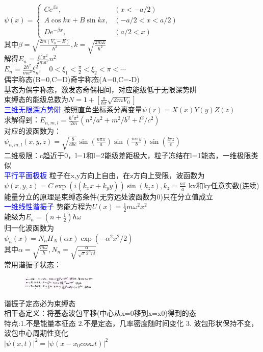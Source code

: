 \documentclass[a4paper,8pt]{extarticle} %
\newcommand{\bluetext}[1]{\textcolor{blue}{#1}}
\begin{document}
\begin{multicols}{3}
$\psi(x)=\begin{cases}
Ce^{\beta x}, & (x < -a/2) \\
A\cos kx + B\sin kx, & (-a/2 < x < a/2) \\
De^{-\beta x}, & (a/2 < x)
\end{cases}$\\
其中$\beta = \sqrt{\frac{2m(V_0-E)}{\hbar^2}},k = \sqrt{\frac{2mE}{\hbar^2}}$\\
解得$E_n = \frac{\hbar^2\pi^2}{2ma^2}n^2$\\
$E_n = \frac{2\hbar^2}{ma^2}\xi_n^2, \quad 0 < \xi_1 < \frac{\pi}{2} < \xi_2 < \pi < \cdots$\\
偶宇称态(B=0,C=D)奇宇称态(A=0,C=-D)\\基态为偶宇称态，激发态奇偶相间，对应能级低于无限深势阱
\\束缚态的能级总数为$N=1+[\frac{a}{\hbar\pi}\sqrt{2mV_0}]$\\
\bluetext{三维无限深方势阱}
按照直角坐标系分离变量$\psi(r) = X(x)Y(y)Z(z)$\\
求解得到：$E_{n,m,l} = \frac{\hbar^2\pi^2}{2m}(n^2/a^2 + m^2/b^2 + l^2/c^2)$\\
对应的波函数为：\\$\psi_{n,m,l}(x,y,z) = \sqrt{\frac{8}{abc}}\sin(\frac{n\pi x}{a})\sin(\frac{m\pi y}{b})\sin(\frac{l\pi z}{c})$\\
二维极限：c趋近于0，l=1和l=2能级差距极大，粒子冻结在l=1能态，一维极限类似\\
\bluetext{平行平面极板}
粒子在x,y方向上自由，在z方向上受限，波函数为\\
$\psi(x,y,z) = C\exp(i(k_xx+k_yy))\sin(k_zz),k_z=\frac{n\pi}{a}$ kx和ky任意实数(连续)\\
能量分立的原理是束缚态条件(无穷远处波函数为0)只在分立值成立\\
\bluetext{一维线性谐振子}
势能方程为$U(x) = \frac{1}{2}m\omega^2x^2$\\
能级为$E_n = (n+\frac{1}{2})\hbar\omega$\\
归一化波函数为\\$\psi_n(x) = N_nH_N(\alpha x)\exp(-\alpha^2x^2/2)$\\
其中$\alpha = \sqrt{\frac{m\omega}{\hbar}},N_n = \sqrt{\frac{\alpha}{\sqrt{\pi}2^n n!}}$\\
常用谐振子状态：\\
\begin{figure}[H]
    \vspace{-0.5cm}
    \centering
    \includegraphics[width=0.32\textwidth]{images/31.png}
    \vspace{-0.6cm}
\end{figure}
谐振子定态必为束缚态\\
相干态定义：将基态波包平移(中心从x=0移到x=x0)得到的态\\
特点:1.不是能量本征态 2.不是定态，几率密度随时间变化 3. 波包形状保持不变，波包中心周期性变化\\
$|\psi(x,t)|^2=|\psi(x-x_0 cos\omega t)|^2$


\end{multicols}
\end{document}
